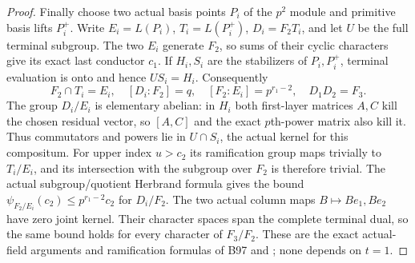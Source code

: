 \begin{proof}
Finally choose two actual basis points $P_i$ of the $p^2$
module and primitive basis lifts $P_i^+$. Write $E_i=L(P_i)$,
$T_i=L(P_i^+)$, $D_i=F_2T_i$, and let $U$ be the full terminal
subgroup. The two $E_i$ generate $F_2$, so sums of their cyclic
characters give its exact last conductor $c_1$.
If $H_i,S_i$ are the stabilizers of $P_i,P_i^+$, terminal
evaluation is onto and hence $US_i=H_i$. Consequently
\[
 F_2\cap T_i=E_i,\quad[D_i:F_2]=q,\quad
 [F_2:E_i]=p^{r_1-2},\quad D_1D_2=F_3.               \tag{B-RD99.11}
\]
The group $D_i/E_i$ is elementary abelian: in $H_i$ both
first-layer matrices $A,C$ kill the chosen residual vector,
so $[A,C]$ and the exact $p$th-power matrix also kill it.
Thus commutators and powers lie in $U\cap S_i$, the actual
kernel for this compositum. For upper index $u>c_2$ its
ramification group maps trivially to $T_i/E_i$, and its
intersection with the subgroup over $F_2$ is therefore trivial.
The actual subgroup/quotient Herbrand formula gives the bound
$\psi_{F_2/E_i}(c_2)\le p^{r_1-2}c_2$ for $D_i/F_2$.
The two actual column maps $B\mapsto Be_1,Be_2$ have zero
joint kernel. Their character spaces span the complete terminal
dual, so the same bound holds for every character of $F_3/F_2$.
These are the exact actual-field arguments and ramification
formulas of B97 and \cite[Proposition3.7, Theorem3.10 and
Proposition3.13, complete proofs, pp.~14--16]{ColmezCorpsLocaux};
none depends on $t=1$.
\end{proof}

